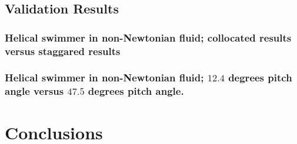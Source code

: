 \documentclass[]{article}
\begin{document}
\subsection{Validation Results} 


\subsubsection{Helical swimmer in non-Newtonian fluid; collocated
 results versus staggared results}

\subsubsection{Helical swimmer in non-Newtonian fluid; 
 $12.4$ degrees pitch angle versus $47.5$ degrees pitch angle.}

\section*{Conclusions} 


\newpage


\end{document}
